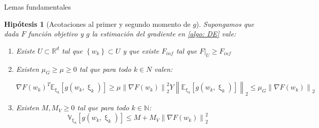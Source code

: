 \documentclass{beamer}
\newtheorem{hyp}[theorem]{Hip\'otesis}
\newcommand{\R}{{\mathbb{R}}}
\newcommand{\N}{{\mathbb{N}}}
\newcommand{\norm}[1]{\left\lVert#1\right\rVert}
\newcommand{\sett}[1]{\left\lbrace#1\right\rbrace}
\newcommand{\expectationsub}[2]{\mathbb{E}_{#1} \left[#2\right]}
\newcommand{\variancesub}[2]{\mathbb{V}_{#1} \left[#2\right]}
\newcommand{\expectationchik}[1]{\expectationsub{\upxi_{k}}{#1}}
\newcommand{\variancechik}[1]{\variancesub{\upxi_{k}}{#1}}
\begin{document}
\begin{frame}{Lemas fundamentales}



\begin{hyp}[Acotaciones al primer y segundo momento de $g$]
	\label{hyp: Acotaciones momentos de g}
	Supongamos que dada $F$ funci\'on objetivo y $g$ la estimaci\'on del gradiente en \ref{algo: DE} vale:
	
	\begin{enumerate}
		\item Existe $U \subset \R^d$ tal que $\sett{w_k} \subset U$ y que existe $F_{inf}$ tal que $F\vert_U \geq F_{inf}$
		\item Existen $\mu_G \geq \mu \geq 0$ tal que para todo $k \in N$ valen:
		
		\begin{subequations}
			\begin{equation}
			\label{eq: Hipotesis 2 subitem 1}
			\nabla F(w_k)^T \expectationchik{g(w_k, \upxi_{k})} \geq \mu \norm{\nabla F(w_k)}_2^2
			\end{equation}
			Y
			\begin{equation}
			\label{eq: Hipotesis 2 subitem 2}
			\norm{\expectationchik{g(w_k, \upxi_{k})}}_2 \leq \mu_G \norm{\nabla F(w_k)}_2
			\end{equation}
		\end{subequations}
		\item 	Existen $M, M_V \geq 0$ tal que para todo $k \in \N$:
		\begin{equation}
		\label{eq: Hipotesis 2 Segundo momento acotado}
		\variancechik{g(w_k, \upxi_{k})} \leq M + M_V \norm{\nabla F (w_k)}_2^2
		\end{equation}
		
	\end{enumerate}
	
\end{hyp}

\end{frame}
\end{document}

